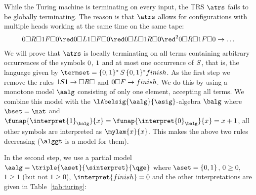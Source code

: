 \begin{example}
{  While the Turing machine is terminating on every input,
  the TRS $\atrs$ fails to be globally terminating.
  The reason is that $\atrs$ allows for configurations with multiple heads working at the same time on the same tape:
  \begin{gather*}
   \blank\wall\sright\wall\free\slleft\wall\blank 
   \red \blank\wall\sleft\free\wall\slleft\wall\blank 
   \red \blank\wall\sleft\wall\free\sright\wall\blank
   \red^2 \blank\wall\sright\wall\free\slleft\wall\blank \to \ldots
  \end{gather*}
  We will prove that $\atrs$ is locally terminating on all terms
  containing arbitrary occurrences of the symbols $0$, $1$
  and at most one occurrence of $S$, that is,
  the language given by $\termset = \{\blank,\free\}^* \,\start\, \{\blank,\free\}^* \finish$.
As the first step we remove the rules $1S1 \to \Box R\Box$ and $0\Box F \to \mit{finish}$.
  We do this by using a monotone model $\aalg$ consisting of only one element, accepting all terms.
  We combine this model with the $\lAbelsig{\aalg}{\asig}$-algebra $\balg$
  where $\bset = \nat$
  and $\funap{\interpret{\free}_\balg}{x} = \funap{\interpret{\blank}_\balg}{x} = x+1$,
  all other symbols are interpreted as $\mylam{x}{x}$.
  This makes the above two rules decreasing ($\alggt$ is a model for them).



  In the second step, we use a partial model $\aalg = \triple{\aset}{\sinterpret}{{\qge}}$ where $\aset = \{0,1\}$,
  $0 \ge 0$, $1 \ge 1$ (but not $1 \ge 0$),
  $\interpret{\finish} = 0$ and the other interpretations are given in Table~\ref{tab:turing}:

}
\end{example}
